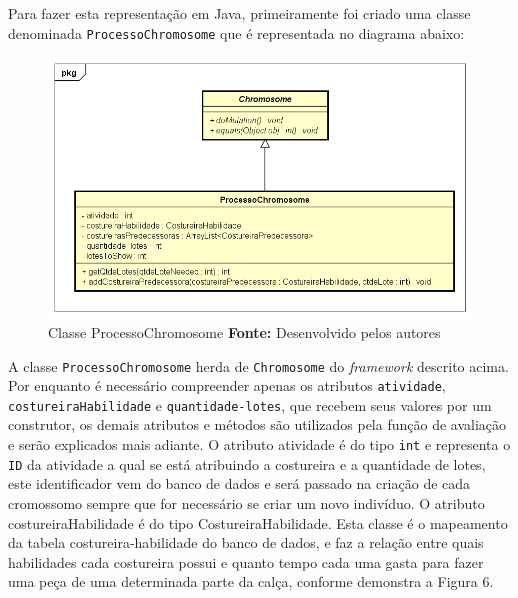 \par Para fazer esta representação em Java, primeiramente foi criado uma classe denominada \texttt{ProcessoChromosome} que é
representada no diagrama abaixo:

\begin{figure}[h!]
	\centerline{\includegraphics[scale=0.6]{./imagens/processo_chromosome_diagram.png}}
	\caption[ProcessoChromosome Class]
	{Classe ProcessoChromosome \textbf{Fonte:} Desenvolvido pelos autores}
	\label{fig:exemplo1}
\end{figure}


\par A classe \texttt{ProcessoChromosome} herda de \texttt{Chromosome} do \textit{framework} descrito acima. Por enquanto
é necessário compreender apenas os atributos \texttt{atividade}, \texttt{costureiraHabilidade} e \texttt{quantidade-lotes}, 
que recebem seus valores por um construtor, os demais atributos e métodos são utilizados pela função de avaliação e serão 
explicados mais adiante. O atributo atividade é do tipo \texttt{int} e representa o \texttt{ID} da atividade a qual se está
atribuindo a costureira e a quantidade de lotes, este identificador vem do banco de dados e será passado na criação de cada cromossomo
sempre que for necessário se criar um novo indivíduo. O atributo costureiraHabilidade é do tipo CostureiraHabilidade. Esta classe
é o mapeamento da tabela costureira-habilidade do banco de dados, e faz a relação entre quais habilidades cada costureira
possui e quanto tempo cada uma gasta para fazer uma peça de uma determinada parte da calça, conforme demonstra a Figura 6.

\newpage

